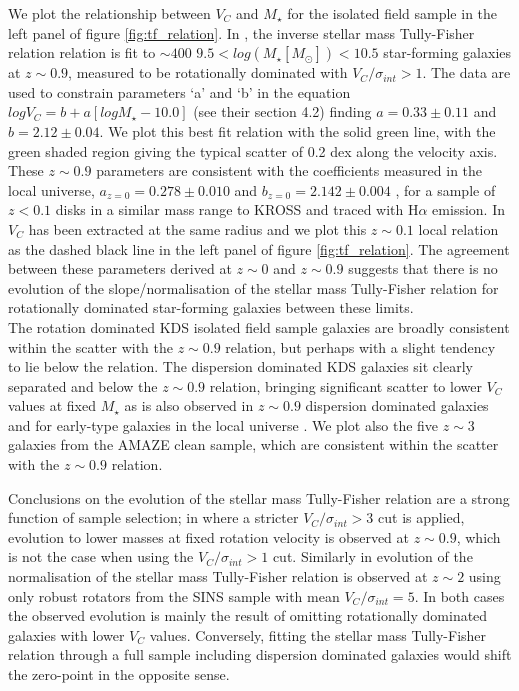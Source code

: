\documentclass[fleqn,usenatbib]{mn2e}
\begin{document}
We plot the relationship between $V_{C}$ and $M_{\star}$ for the isolated field sample in the left panel of figure \ref{fig:tf_relation}.
In \cite{Harrison2017}, the inverse stellar mass Tully-Fisher relation relation is fit to $\sim400$ $9.5 < log(M_{\star}[M_{\odot}]) < 10.5$ star-forming galaxies at $z\sim0.9$, measured to be rotationally dominated with $V_{C}/\sigma_{int} > 1$.
The data are used to constrain parameters `a' and `b' in the equation $logV_{C}=b+a[logM_{\star} - 10.0]$ (see their section 4.2) finding $a = 0.33 \pm 0.11$ and $b = 2.12 \pm 0.04$.
We plot this best fit relation with the solid green line, with the green shaded region giving the typical scatter of 0.2 dex along the velocity axis.
These $z\sim0.9$ parameters are consistent with the coefficients measured in the local universe, $a_{z=0} = 0.278 \pm 0.010$ and $b_{z=0} = 2.142 \pm 0.004$ \citep{Reyes2011}, for a sample of $z<0.1$ disks in a similar mass range to KROSS and traced with H$\alpha$ emission.
In \citep{Reyes2011} $V_{C}$ has been extracted at the same radius and we plot this $z\sim 0.1$ local relation as the dashed black line in the left panel of figure \ref{fig:tf_relation}.
The agreement between these parameters derived at $z\sim0$ and $z\sim0.9$ suggests that there is no evolution of the slope/normalisation of the stellar mass Tully-Fisher relation for rotationally dominated star-forming galaxies between these limits. \\

The rotation dominated KDS isolated field sample galaxies are broadly consistent within the scatter with the $z\sim 0.9$ relation, but perhaps with a slight tendency to lie below the relation.
The dispersion dominated KDS galaxies sit clearly separated and below the $z\sim0.9$ relation, bringing significant scatter to lower $V_{C}$ values at fixed $M_{\star}$ as is also observed in $z\sim0.9$ dispersion dominated galaxies and for early-type galaxies in the local universe \citep[e.g.][]{Romanowsky2012}. 
We plot also the five $z\sim3$ galaxies from the AMAZE clean sample, which are consistent within the scatter with the $z\sim0.9$ relation.

Conclusions on the evolution of the stellar mass Tully-Fisher relation are a strong function of sample selection; in \cite{Tiley2016a} where a stricter $V_{C}/\sigma_{int} > 3$ cut is applied, evolution to lower masses at fixed rotation velocity is observed at $z\sim0.9$, which is not the case when using the $V_{C}/\sigma_{int} > 1$ cut.
Similarly in \cite{Cresci2009} evolution of the normalisation of the stellar mass Tully-Fisher relation is observed at $z\sim2$ using only robust rotators from the SINS sample with mean $V_{C}/\sigma_{int} = 5$.
In both cases the observed evolution is mainly the result of omitting rotationally dominated galaxies with lower $V_{C}$ values.
Conversely, fitting the stellar mass Tully-Fisher relation through a full sample including dispersion dominated galaxies would shift the zero-point in the opposite sense.
\end{document}

